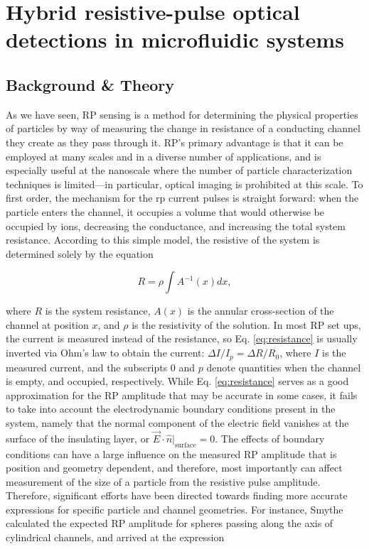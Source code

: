 \graphicspath{{../images/ch4/}}	%


\chapter{Hybrid resistive-pulse optical detections in microfluidic systems}
\label{chap:rpim}

	

	\section{Background \& Theory}
		
		As we have seen, RP sensing is a method for determining the physical properties of particles by way of measuring the change in resistance of a conducting channel they create as they pass through it. RP's primary advantage is that it can be employed at many scales and in a diverse number of applications, and is especially useful at the nanoscale where the number of particle characterization techniques is limited---in particular, optical imaging is prohibited at this scale. To first order, the mechanism for the rp current pulses is straight forward: when the particle enters the channel, it occupies a volume that would otherwise be occupied by ions, decreasing the conductance, and increasing the total system resistance. According to this simple model, the resistive of the system is determined solely by the equation
		
		\begin{equation}\label{eq:resistance}
			R=\rho\int A^{-1}\left(x\right) dx,
		\end{equation}
		
		where $R$ is the system resistance, $A\left(x\right)$ is the annular cross-section of the channel at position $x$, and $\rho$ is the resistivity of the solution. In most RP set ups, the current is measured instead of the resistance, so Eq. \ref{eq:resistance} is usually inverted via Ohm's law to obtain the current: $\Delta I/I_{p}=\Delta R/R_{0}$, where $I$ is the measured current, and the subscripts $0$ and $p$ denote quantities when the channel is empty, and occupied, respectively. While Eq. \ref{eq:resistance} serves as a good approximation for the RP amplitude that may be accurate in some cases, it fails to take into account the electrodynamic boundary conditions present in the system, namely that the normal component of the electric field vanishes at the surface of the insulating layer, or $\vec{E}\cdot\hat{n}\left.\right\vert_{\mathrm{surface}}=0$. The effects of boundary conditions can have a large influence on the measured RP amplitude that is position and geometry dependent, and therefore, most importantly can affect measurement of the size of a particle from the resistive pulse amplitude. Therefore, significant efforts have been directed towards finding more accurate expressions for specific particle and channel geometries. For instance, Smythe calculated the expected RP amplitude for spheres passing along the axis of cylindrical channels, and arrived at the expression
		
